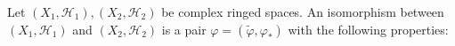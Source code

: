 Let $(X_1, \mathcal{H}_1), (X_2, \mathcal{H}_2)$ be complex ringed spaces. An isomorphism between $(X_1, \mathcal{H}_1)$ and $(X_2, \mathcal{H}_2)$ is a pair $\varphi = (\tilde{\varphi}, \varphi_*)$ with the following properties:
